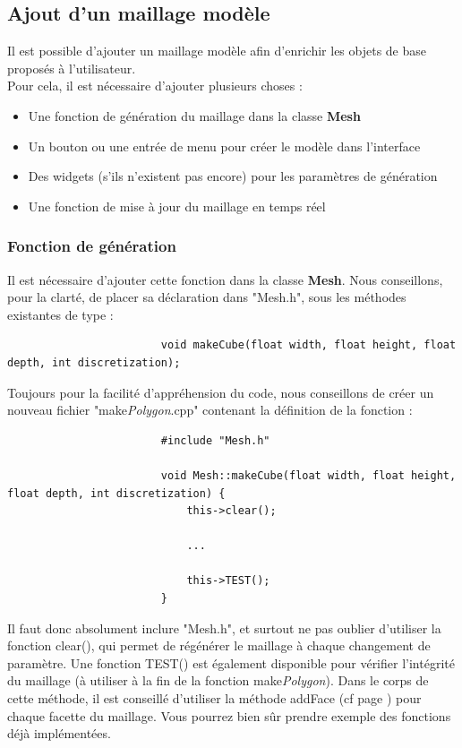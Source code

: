 \documentclass[a4paper]{memoir}
\begin{document}
			\subsection{Ajout d'un maillage modèle}
				Il est possible d'ajouter un maillage modèle afin d'enrichir les objets de base proposés à l'utilisateur.\\
				Pour cela, il est nécessaire d'ajouter plusieurs choses :
				\begin{itemize}
					\item Une fonction de génération du maillage dans la classe \textbf{Mesh}
					\item Un bouton ou une entrée de menu pour créer le modèle dans l'interface
					\item Des widgets (s'ils n'existent pas encore) pour les paramètres de génération
					\item Une fonction de mise à jour du maillage en temps réel
				\end{itemize}
				
				\subsubsection{Fonction de génération}
					Il est nécessaire d'ajouter cette fonction dans la classe \textbf{Mesh}. Nous conseillons, pour la clarté, de placer sa déclaration dans 
					"Mesh.h", sous les méthodes existantes de type :
					\begin{verbatim}
						void makeCube(float width, float height, float depth, int discretization);
					\end{verbatim}
					Toujours pour la facilité d'appréhension du code, nous conseillons de créer un nouveau fichier "make\textit{Polygon}.cpp" contenant la 
					définition de la fonction :
					\begin{verbatim}
						#include "Mesh.h"

						void Mesh::makeCube(float width, float height, float depth, int discretization) {
						    this->clear();
							
						    ...
							
						    this->TEST();
						}
					\end{verbatim}
					Il faut donc absolument inclure "Mesh.h", et surtout ne pas oublier d'utiliser la fonction clear(), qui permet de régénérer le maillage à
					chaque changement de paramètre. Une fonction TEST() est également disponible pour vérifier l'intégrité du maillage (à utiliser à la fin 
					de la fonction make\textit{Polygon}). Dans le corps de cette méthode, il est conseillé d'utiliser la méthode addFace (cf page 
					\pageref{mesh-dev}) pour chaque facette du maillage. Vous pourrez bien sûr prendre exemple des fonctions déjà implémentées.
					
\end{document}
